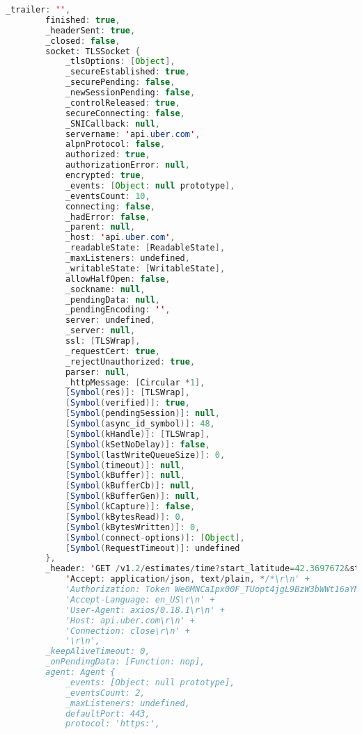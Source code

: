 \begin{lstlisting}[language=Java, caption=Pesan Error Perkakas \textit{Uber CLI}]
        _trailer: '',
        finished: true,
        _headerSent: true,
        _closed: false,
        socket: TLSSocket {
            _tlsOptions: [Object],
            _secureEstablished: true,
            _securePending: false,
            _newSessionPending: false,
            _controlReleased: true,
            secureConnecting: false,
            _SNICallback: null,
            servername: 'api.uber.com',
            alpnProtocol: false,
            authorized: true,
            authorizationError: null,
            encrypted: true,
            _events: [Object: null prototype],
            _eventsCount: 10,
            connecting: false,
            _hadError: false,
            _parent: null,
            _host: 'api.uber.com',
            _readableState: [ReadableState],
            _maxListeners: undefined,
            _writableState: [WritableState],
            allowHalfOpen: false,
            _sockname: null,
            _pendingData: null,
            _pendingEncoding: '',
            server: undefined,
            _server: null,
            ssl: [TLSWrap],
            _requestCert: true,
            _rejectUnauthorized: true,
            parser: null,
            _httpMessage: [Circular *1],
            [Symbol(res)]: [TLSWrap],
            [Symbol(verified)]: true,
            [Symbol(pendingSession)]: null,
            [Symbol(async_id_symbol)]: 48,
            [Symbol(kHandle)]: [TLSWrap],
            [Symbol(kSetNoDelay)]: false,
            [Symbol(lastWriteQueueSize)]: 0,
            [Symbol(timeout)]: null,
            [Symbol(kBuffer)]: null,
            [Symbol(kBufferCb)]: null,
            [Symbol(kBufferGen)]: null,
            [Symbol(kCapture)]: false,
            [Symbol(kBytesRead)]: 0,
            [Symbol(kBytesWritten)]: 0,
            [Symbol(connect-options)]: [Object],
            [Symbol(RequestTimeout)]: undefined
        },
        _header: 'GET /v1.2/estimates/time?start_latitude=42.3697672&start_longitude=-71.077356 HTTP/1.1\r\n' +
            'Accept: application/json, text/plain, */*\r\n' +
            'Authorization: Token We0MNCaIpx00F_TUopt4jgL9BzW3bWWt16aYM4mh\r\n' +
            'Accept-Language: en_US\r\n' +
            'User-Agent: axios/0.18.1\r\n' +
            'Host: api.uber.com\r\n' +
            'Connection: close\r\n' +
            '\r\n',
        _keepAliveTimeout: 0,
        _onPendingData: [Function: nop],
        agent: Agent {
            _events: [Object: null prototype],
            _eventsCount: 2,
            _maxListeners: undefined,
            defaultPort: 443,
            protocol: 'https:',

\end{lstlisting}
